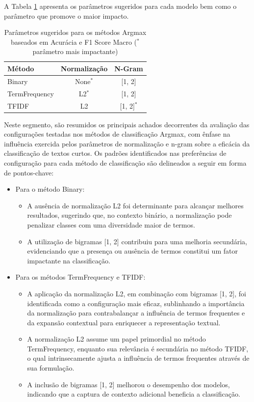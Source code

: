 A Tabela \ref{tab:resumo_parametros} apresenta os parâmetros sugeridos para cada modelo bem como o parâmetro que promove o maior impacto.

\begin{table}[H]
\centering
\caption{Parâmetros sugeridos para os métodos Argmax baseados em Acurácia e F1 Score Macro ($^*$ parâmetro mais impactante)}
\label{tab:resumo_parametros}
\begin{tabular}{lcc}
\hline
\textbf{Método} & \textbf{Normalização} & \textbf{N-Gram} \\
\hline
Binary & None$^*$ & [1, 2] \\
TermFrequency & L2$^*$ & [1, 2] \\
TFIDF & L2 & [1, 2]$^*$ \\
\hline
\end{tabular}
\end{table}

Neste segmento, são resumidos os principais achados decorrentes da avaliação das configurações testadas nos métodos de classificação Argmax, com ênfase na influência exercida pelos parâmetros de normalização e n-gram sobre a eficácia da classificação de textos curtos. Os padrões identificados nas preferências de configuração para cada método de classificação são delineados a seguir em forma de pontos-chave:

\begin{itemize}
    \item Para o método Binary:
    \begin{itemize}
        \item A ausência de normalização L2 foi determinante para alcançar melhores resultados, sugerindo que, no contexto binário, a normalização pode penalizar classes com uma diversidade maior de termos.
        \item A utilização de bigramas [1, 2] contribuiu para uma melhoria secundária, evidenciando que a presença ou ausência de termos constitui um fator impactante na classificação.
    \end{itemize}
    \item Para os métodos TermFrequency e TFIDF:
    \begin{itemize}
        \item A aplicação da normalização L2, em combinação com bigramas [1, 2], foi identificada como a configuração mais eficaz, sublinhando a importância da normalização para contrabalançar a influência de termos frequentes e da expansão contextual para enriquecer a representação textual.
        \item A normalização L2 assume um papel primordial no método TermFrequency, enquanto sua relevância é secundária no método TFIDF, o qual intrinsecamente ajusta a influência de termos frequentes através de sua formulação.
        \item A inclusão de bigramas [1, 2] melhorou o desempenho dos modelos, indicando que a captura de contexto adicional beneficia a classificação.
    \end{itemize}
\end{itemize}

